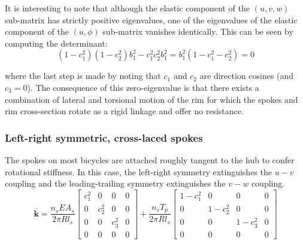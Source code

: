 \documentclass[\rootdir/thesis.tex]{subfiles}
\begin{document}
It is interesting to note that although the elastic component of the $(u,v,w)$ sub-matrix has strictly positive eigenvalues, one of the eigenvalues of the elastic component of the $(u,\phi)$ sub-matrix vanishes identically. This can be seen by computing the determinant:
\begin{equation}
(1-c_1^2)(1-c_2^2)b_1^2 - c_1^2c_2^2b_1^2 = b_1^2(1 - c_1^2 - c_2^2) = 0
\end{equation}

where the last step is made by noting that $c_1$ and $c_2$ are direction cosines (and $c_3=0$). The consequence of this zero-eigenvalue is that there exists a combination of lateral and torsional motion of the rim for which the spokes and rim cross-section rotate as a rigid linkage and offer no resistance.

\subsubsection{Left-right symmetric, cross-laced spokes}
The spokes on most bicycles are attached roughly tangent to the hub to confer rotational stiffness. In this case, the left-right symmetry extinguishes the $u-v$ coupling and the leading-trailing symmetry extinguishes the $v-w$ coupling.
\begin{equation}
\label{eq:kbar_symm_ncross}
\bar{\mathbf{k}} = \frac{n_s EA_s}{2\pi R l_s}
\begin{bmatrix}
c_1^2     & 0     & 0 & 0\\
0 & c_2^2 & 0     & 0\\
0 & 0     & c_3^2 & 0\\
0 & 0     & 0     & 0
\end{bmatrix} +
\frac{n_s T_p}{2\pi R l_s}
\begin{bmatrix}
1-c_1^2 & 0       & 0       & 0\\
0       & 1-c_2^2 & 0       & 0\\
0       & 0       & 1-c_3^2 & 0\\
0       & 0       & 0       & 0
\end{bmatrix}
\end{equation}
\end{document}
